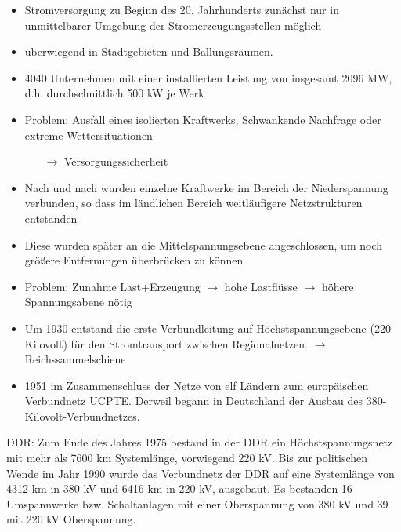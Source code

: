 \documentclass[paper=a4, fontsize=12pt]{article}
\begin{document}
\begin{itemize}
\item Stromversorgung zu Beginn des 20. Jahrhunderts zunächst nur in unmittelbarer Umgebung der Stromerzeugungsstellen möglich
\item überwiegend in Stadtgebieten und Ballungsräumen.
\item 4040 Unternehmen mit einer installierten Leistung von insgesamt 2096 MW, d.h. durchschnittlich 500 kW je Werk
\item Problem: Ausfall eines isolierten Kraftwerks, Schwankende Nachfrage oder extreme Wettersituationen
\begin{itemize}
\item[$\rightarrow$] Versorgungssicherheit
\end{itemize} 

\item Nach und nach wurden einzelne Kraftwerke im Bereich der Niederspannung verbunden, so dass im ländlichen Bereich weitläufigere Netzstrukturen entstanden
\item Diese wurden später an die Mittelspannungsebene angeschlossen, um noch größere Entfernungen überbrücken zu können
\item Problem: Zunahme Last+Erzeugung $\rightarrow$ hohe Lastflüsse $\rightarrow$ höhere Spannungsabene nötig

\item Um 1930 entstand die erste Verbundleitung auf Höchstspannungsebene (220 Kilovolt) für den Stromtransport zwischen Regionalnetzen.
$\rightarrow$ Reichssammelschiene

\item 1951 im Zusammenschluss der Netze von elf Ländern zum europäischen Verbundnetz UCPTE. Derweil begann in Deutschland
 der Ausbau des 380-Kilovolt-Verbundnetzes.
\end{itemize}

DDR:
Zum Ende des Jahres 1975 bestand in der DDR ein Höchstspannungsnetz mit mehr als 7600 km Systemlänge, vorwiegend 220
kV.  Bis zur politischen Wende im Jahr 1990 wurde das Verbundnetz der DDR auf eine Systemlänge von 4312 km in 380 kV und
6416 km in 220 kV, ausgebaut. Es bestanden 16 Umspannwerke bzw. Schaltanlagen mit einer Oberspannung von 380 kV und 39
mit 220 kV Oberspannung.

\subsection*{\citeauthor{Ravn1996} \cite{Ravn1996}}
\end{document}
